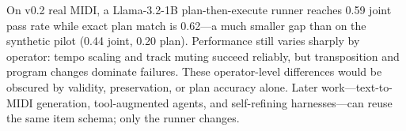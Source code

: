 On v0.2 real MIDI, a Llama-3.2-1B plan-then-execute runner reaches 0.59 joint pass rate while exact plan match is 0.62---a much smaller gap than on the synthetic pilot (0.44 joint, 0.20 plan). Performance still varies sharply by operator: tempo scaling and track muting succeed reliably, but transposition and program changes dominate failures. These operator-level differences would be obscured by validity, preservation, or plan accuracy alone. Later work---text-to-MIDI generation, tool-augmented agents, and self-refining harnesses---can reuse the same item schema; only the runner changes.
